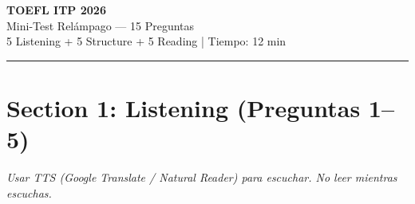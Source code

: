 \documentclass[10pt,a4paper]{article}
\begin{document}
\begin{center}
{\LARGE \textbf{TOEFL ITP 2026}}\\[4pt]
{\large Mini-Test Rel\'ampago --- 15 Preguntas}\\[4pt]
{\small 5 Listening + 5 Structure + 5 Reading | Tiempo: 12 min}\\[2pt]
\rule{\textwidth}{0.8pt}
\end{center}

\vspace{8pt}

\section*{Section 1: Listening (Preguntas 1--5)}
{\small\textit{Usar TTS (Google Translate / Natural Reader) para escuchar.
No leer mientras escuchas.}}
\end{document}
